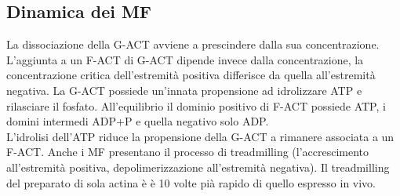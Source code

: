     \subsection{Dinamica dei MF}
        La dissociazione della G-ACT avviene a prescindere dalla sua concentrazione. L'aggiunta a un F-ACT di G-ACT dipende invece dalla concentrazione, la concentrazione critica dell'estremità positiva differisce da quella all'estremità negativa.
        La G-ACT possiede un'innata propensione ad idrolizzare ATP e rilasciare il fosfato. All'equilibrio il dominio positivo di F-ACT possiede ATP, i domini intermedi ADP+P e quella negativo solo ADP.\\
        L'idrolisi dell'ATP riduce la propensione della G-ACT a rimanere associata a un F-ACT.
        Anche i MF presentano il processo di treadmilling (l'accrescimento all'estremità positiva, depolimerizzazione all'estremità negativa).
        Il treadmilling del preparato di sola actina è è 10 volte pià rapido di quello espresso in vivo.
            
